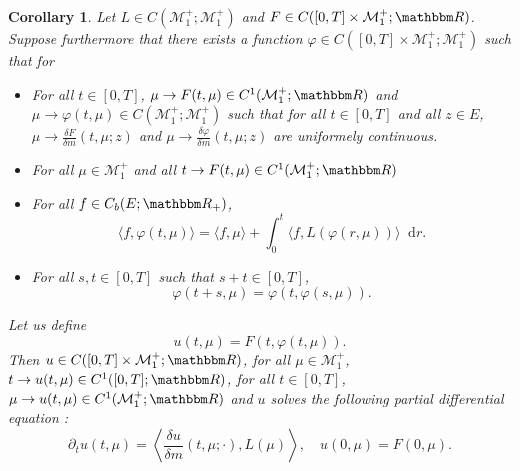 \documentclass[a4paper,11pt, reqno]{amsart}
\newcommand{\cM}{\mathcal{M}}	\newcommand{\MM}{\mathbbm{M}}
\newcommand{\dd}{\mathop{}\!\mathrm{d}}
\newcommand{\1}{\mathbbm{1}}
\theoremstyle{plain}
\newtheorem{corollary}[theorem]{Corollary}
\theoremstyle{definition}
\begin{document}
\begin{corollary}
  Let $L \in C (\cM_1^+ ; \cM_1^+)$ and $F \in C ([0, T]
  \times \cM_1^+ ; \RR)$. Suppose furthermore that there exists
  a function $\varphi \in C ([0, T] \times \cM_1^+ ; \cM_1^+)$
  such that for
  \begin{itemize}
    \item For all $t \in [0, T]$, $\mu \rightarrow F (t, \mu) \in C^1
    (\cM_1^+ ; \RR)$ and $\mu \rightarrow \varphi (t, \mu) \in
    C (\cM_1^+ ; \cM_1^+)$ such that for all $t \in [0, T]$
    and all $z \in E$, $\mu \rightarrow \frac{\delta F}{\delta m} (t, \mu ;
    z)$ and $\mu \rightarrow \frac{\delta \varphi}{\delta m} (t, \mu ; z)$ are
    uniformely continuous.
    
    \item For all $\mu \in \cM_1^+$ and all $t \rightarrow F (t, \mu)
    \in C^1 (\cM_1^+ ; \RR)$
    
    \item For all $f \in C_b (E ; \RR_+)$,
    \[ \langle f, \varphi (t, \mu) \rangle = \langle f, \mu \rangle + \int_0^t
       \langle f, L (\varphi (r, \mu)) \rangle \dd r. \]
    \item For all $s, t \in [0, T]$ such that $s + t \in [0, T]$,
    \[ \varphi (t + s, \mu) = \varphi (t, \varphi (s, \mu)) . \]
  \end{itemize}
  Let us define
  \[ u (t, \mu) = F (t, \varphi (t, \mu)) . \]
  Then $u \in C ([0, T] \times \cM_1^+ ; \RR)$, for all $\mu
  \in \cM_1^+$, $t \rightarrow u (t, \mu) \in C^1 ([0, T] ;
  \RR)$, for all $t \in [0, T]$, $\mu \rightarrow u (t, \mu) \in C^1
  (\cM_1^+ ; \RR)$ and $u$ solves the following partial
  differential equation :
  \[ \partial_t u (t, \mu) = \left\langle \frac{\delta u}{\delta m} (t, \mu ;
     \cdot), L (\mu) \right\rangle, \quad u (0, \mu) = F (0, \mu) . \]
\end{corollary}
\end{document}
